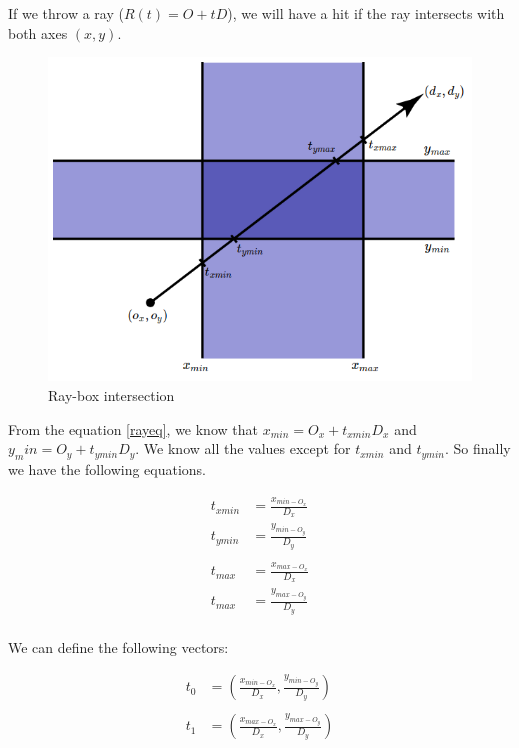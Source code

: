 \documentclass[titlepage,12pt]{report}
\begin{document}
If we throw a ray ($R(t) = O + tD$), we will have a hit if the ray intersects with both axes $(x,y)$.

\begin{figure}[!ht]
	\centering
	\includegraphics[scale=0.5]{media/slab_2.png}
	\caption{Ray-box intersection}
	\label{AABB2}
\end{figure}

From the equation \ref{rayeq}, we know that $x_{min} = O_x + t_{xmin} D_x$ and $y_min = O_y + t_{ymin} D_y$. We know all the values except for $t_{xmin}$ and $t_{ymin}$. So finally we have the following equations.

\begin{equation} \label{slab_method_1}
\begin{split}
t_{xmin} & = \frac{x_{min - O_x}}{D_x} \\
t_{ymin} & = \frac{y_{min - O_y}}{D_y} \\
\\
t_{max} & = \frac{x_{max - O_x}}{D_x} \\
t_{max} & = \frac{y_{max - O_y}}{D_y} \\
\end{split} 
\end{equation}

We can define the following vectors:

\begin{equation} \label{slab_method_2}
\begin{split}
t_{0} & = \left( \frac{x_{min - O_x}}{D_x}, \frac{y_{min - O_y}}{D_y} \right) \\
\\
t_{1} & = \left( \frac{x_{max - O_x}}{D_x}, \frac{y_{max - O_y}}{D_y} \right) \\
\end{split} 
\end{equation}
\end{document}
